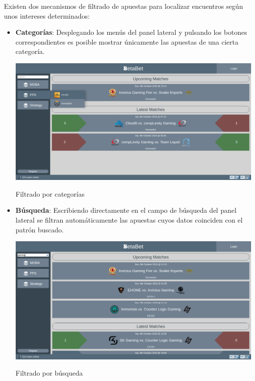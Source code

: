 \documentclass{article}
\begin{document}
\newpage
Existen dos mecanismos de filtrado de apuestas para localizar encuentros según unos intereses determinados:
\begin{itemize}
    \item\textbf{Categorías}: Desplegando los menús del panel lateral y pulsando los botones correspondientes es posible mostrar únicamente las apuestas de una cierta categoría.
        \smallbreak
        \begin{minipage}{\linewidth}
            \centering
            \captionsetup{type=figure}
            \includegraphics[width=\linewidth]{fig3}
            \caption{Filtrado por categorías}
            \label{fig:fig3}
        \end{minipage}
    \item\textbf{Búsqueda}: Escribiendo directamente en el campo de búsqueda del panel lateral se filtran automáticamente las apuestas cuyos datos coinciden con el patrón buscado.
        \smallbreak
        \begin{minipage}{\linewidth}
            \centering
            \captionsetup{type=figure}
            \includegraphics[width=\linewidth]{fig4}
            \caption{Filtrado por búsqueda}
            \label{fig:fig4}
        \end{minipage}
\end{itemize}
\newpage
\end{document}
